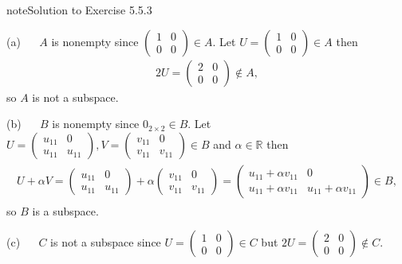 \documentclass[letterpaper,10pt,english]{jupyterBook}
\begin{document}
\begin{sphinxadmonition}{note}{Solution to Exercise 5.5.3}



\sphinxAtStartPar
(a)   \(A\) is non\sphinxhyphen{}empty since \(\begin{pmatrix} 1 & 0 \\ 0 & 0 \end{pmatrix} \in A\). Let \(U = \begin{pmatrix} 1 & 0 \\ 0 & 0 \end{pmatrix} \in A\) then
\begin{equation*}
\begin{split} 2U = \begin{pmatrix} 2 & 0 \\ 0 & 0 \end{pmatrix} \notin A, \end{split}
\end{equation*}
\sphinxAtStartPar
so \(A\) is not a subspace.

\sphinxAtStartPar
(b)   \(B\) is non\sphinxhyphen{}empty since \(0_{2\times 2} \in B\). Let \(U = \begin{pmatrix} u_{11} & 0 \\ u_{11} & u_{11} \end{pmatrix}, V = \begin{pmatrix} v_{11} & 0 \\ v_{11} & v_{11} \end{pmatrix} \in B\) and \(\alpha \in \mathbb{R}\) then
\begin{equation*}
\begin{split} \begin{align*}
    U + \alpha V = 
    \begin{pmatrix} u_{11} & 0 \\ u_{11} & u_{11} \end{pmatrix} + \alpha
    \begin{pmatrix} v_{11} & 0 \\ v_{11} & v_{11}\end{pmatrix}
    = \begin{pmatrix} u_{11} + \alpha v_{11} & 0 \\ u_{11} + \alpha v_{11} & u_{11} + \alpha v_{11} \end{pmatrix} \in B,
\end{align*} \end{split}
\end{equation*}
\sphinxAtStartPar
so \(B\) is a subspace.

\sphinxAtStartPar
(c)   \(C\) is not a subspace since \(U = \begin{pmatrix} 1 & 0 \\ 0 & 0 \end{pmatrix} \in C\) but \(2U = \begin{pmatrix} 2 & 0 \\ 0 & 0 \end{pmatrix} \notin C\).
\end{sphinxadmonition}
 \label{_pages/A5_Vector_spaces_exercises_solutions:_pages/A5_Vector_spaces_exercises_solutions-solution-3}
\end{document}
